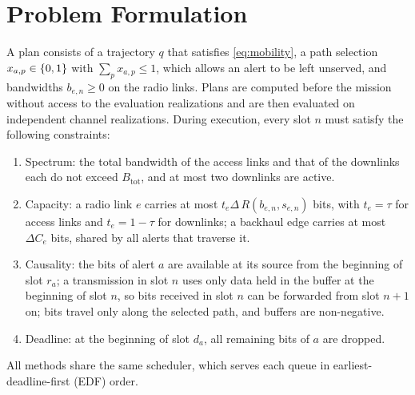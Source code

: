 \section{Problem Formulation}
\label{sec:problem}

A plan consists of a trajectory $q$ that satisfies \eqref{eq:mobility}, a path selection $x_{a,p}\in\{0,1\}$ with $\sum_p x_{a,p}\le 1$, which allows an alert to be left unserved, and bandwidths $b_{e,n}\ge 0$ on the radio links. Plans are computed before the mission without access to the evaluation realizations and are then evaluated on independent channel realizations. During execution, every slot $n$ must satisfy the following constraints:
\begin{enumerate}
\item Spectrum: the total bandwidth of the access links and that of the downlinks each do not exceed $B_{\mathrm{tot}}$, and at most two downlinks are active.
\item Capacity: a radio link $e$ carries at most $t_e\Delta\,R(b_{e,n},s_{e,n})$ bits, with $t_e=\tau$ for access links and $t_e=1-\tau$ for downlinks; a backhaul edge carries at most $\Delta C_e$ bits, shared by all alerts that traverse it.
\item Causality: the bits of alert $a$ are available at its source from the beginning of slot $r_a$; a transmission in slot $n$ uses only data held in the buffer at the beginning of slot $n$, so bits received in slot $n$ can be forwarded from slot $n+1$ on; bits travel only along the selected path, and buffers are non-negative.
\item Deadline: at the beginning of slot $d_a$, all remaining bits of $a$ are dropped.
\end{enumerate}
All methods share the same scheduler, which serves each queue in earliest-deadline-first (EDF) order.


